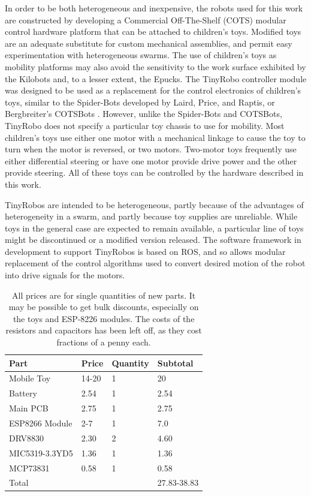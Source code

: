\documentclass[]{article}
\begin{document}
In order to be both heterogeneous and inexpensive, the robots used for this work are constructed by developing a Commercial Off-The-Shelf (COTS) modular control hardware platform that can be attached to children's toys. 
Modified toys are an adequate substitute for custom mechanical assemblies, and permit easy experimentation with heterogeneous swarms. 
The use of children's toys as mobility platforms may also avoid the sensitivity to the work surface exhibited by the Kilobots and, to a lesser extent, the Epucks.
The TinyRobo controller module was designed to be used as a replacement for the control electronics of children's toys, similar to the Spider-Bots developed by Laird, Price, and Raptis, or Bergbreiter's COTSBots \cite{lairdspider, bergbreiter2003cotsbots}.
However, unlike the Spider-Bots and COTSBots, TinyRobo does not specify a particular toy chassis to use for mobility. 
Most children's toys use either one motor with a mechanical linkage to cause the toy to turn when the motor is reversed, or two motors.
Two-motor toys frequently use either differential steering or have one motor provide drive power and the other provide steering. 
All of these toys can be controlled by the hardware described in this work. 

TinyRobos are intended to be heterogeneous, partly because of the advantages of heterogeneity in a swarm, and partly because toy supplies are unreliable.
While toys in the general case are expected to remain available, a particular line of toys might be discontinued or a modified version released. 
The software framework in development to support TinyRobos is based on ROS, and so allows modular replacement of the control algorithms used to convert desired motion of the robot into drive signals for the motors. 

\begin{table}
	\begin{tabular}{l l l l}
	Part & Price & Quantity & Subtotal\\
	\hline
	Mobile Toy & 14-20 & 1 & 20 \\
	Battery & 2.54 & 1 & 2.54 \\
	Main PCB & 2.75 &  1 & 2.75 \\
	ESP8266 Module & 2-7 & 1 & 7.0 \\
	DRV8830 & 2.30 & 2 & 4.60 \\
	MIC5319-3.3YD5 & 1.36 & 1 & 1.36 \\
	MCP73831 & 0.58 & 1 & 0.58 \\
	\hline
	Total & & & 27.83-38.83\\
	\end{tabular}
	\caption{All prices are for single quantities of new parts. It may be possible to get bulk discounts, especially on the toys and ESP-8226 modules. The costs of the resistors and capacitors has been left off, as they cost fractions of a penny each.}
\end{table}
\end{document}
